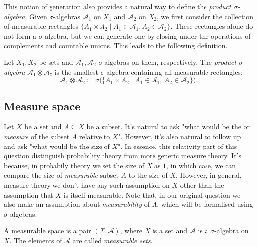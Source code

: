 \medskip

This notion of generation also provides a natural way to define the \emph{product $\sigma$-algebra}. Given $\sigma$-algebras $\mathcal{A}_1$ on $X_1$ and $\mathcal{A}_2$ on $X_2$, we first consider the collection of measurable rectangles $\{A_1 \times A_2 \mid A_1 \in \mathcal{A}_1, A_2 \in \mathcal{A}_2\}$. These rectangles alone do not form a $\sigma$-algebra, but we can generate one by closing under the operations of complements and countable unions. This leads to the following definition.

\begin{definition}
    \label{def:product-sigma-algebra}
    Let $X_1, X_2$ be sets and $\mathcal{A}_1, \mathcal{A}_2$ $\sigma$-algebras on them, respectively. The \emph{product $\sigma$-algebra} $\mathcal{A}_1 \otimes \mathcal{A}_2$ is the smallest $\sigma$-algebra containing all measurable rectangles:
    \[
        \mathcal{A}_1 \otimes \mathcal{A}_2 \coloneq \sigma\bigl(\{A_1 \times A_2 \mid A_1 \in \mathcal{A}_1, \, A_2 \in \mathcal{A}_2\}\bigr).
    \]
\end{definition}

\subsection{Measure space}

Let $X$ be a set and $A \subseteq X$ be a subset. It's natural to ask "what would be the  or \textit{measure} of the subset $A$ relative to $X$". However, it's also natural to follow up and ask "what would be the size of $X$". In essence, this relativity part of this question distinguish probability theory from more generic measure theory. It's because, in probabily theory we set the size of $X$ as $1$, in which case, we can compare the size of \textit{measurable} subset $A$ to the size of $X$. However, in general, measure theory we don't have any such assumption on $X$ other than the assumption that $X$ is itself measurable. Note that, in our original question we also make an assumption about \textit{measurability} of $A$, which will be formalised using $\sigma$-algebras.

\begin{definition}
    A measurable space is a pair $(X, \mathcal{A})$, where $X$ is a set and $\mathcal{A}$ is a $\sigma$-algebra on $X$. The elements of $\mathcal{A}$ are called \emph{measurable sets}.
\end{definition}

